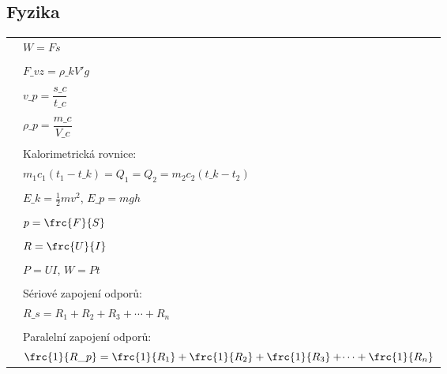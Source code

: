 \documentclass[vyfuk,\classoptions]{fksgeneric}
\begin{document}
\newpage
\subsection{Fyzika}

\begin{framed}
\begin{multicols}{2}
\begin{center}
\begin{tabular}{ r l}
 & $W = Fs$ \\ \\
 & $F\_{vz} = \rho\_k V' g$\\ \\
 & $v\_p = \dfrac{s\_{c}}{t\_{c}}$ \\ \\
 & $\rho\_p = \dfrac{m\_c}{V\_c}$ \\ \\
 & Kalorimetrická rovnice:\\
 & $m_1 c_1 (t_1 - t\_k) = Q_1 = Q_2 = m_2 c_2 (t\_k - t_2)$ \\ \\
 & $E\_{k} = \frac{1}{2} m v^{2}$, \qquad $E\_{p} = m g h$\\ \\
 & $p = \frc{F}{S}$ \\ \\
 & $R = \frc{U}{I}$ \\ \\
 & $P = UI$, \qquad $W = Pt$ \\ \\
 & Sériové zapojení odporů:\\
 & $R\_{s} = R_{1} + R_{2} + R_{3} + \dotsi + R_{n}$ \\ \\
 & Paralelní zapojení odporů:\\
 & $\frc{1}{R\_{p}} = \frc{1}{R_{1}} + \frc{1}{R_{2}} + \frc{1}{R_{3}} + \dotsi + \frc{1}{R_{n}}$
\end{tabular}
\end{center}

\columnbreak


\end{multicols}
\end{framed}
\end{document}
